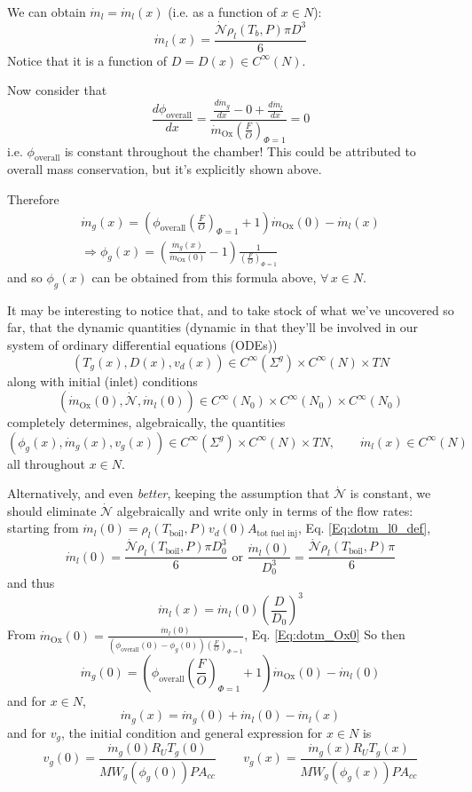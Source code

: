 \documentclass[10pt]{amsart}
\begin{document}
\begin{multicols*}{2}
We can obtain $\dot{m}_l = \dot{m}_l(x)$ (i.e. as a function of $x\in N$):
\[
\dot{m}_l(x) = \frac{ \dot{\mathcal{N}} \rho_l(T_b,P) \pi D^3}{6}
\]
Notice that it is a function of $D=D(x) \in C^{\infty}(N)$.  

Now consider that 
\[
\frac{d\phi_{\text{overall}}}{dx} = \frac{ \frac{ d\dot{m}_g}{dx} - 0 + \frac{d\dot{m}_l}{dx} }{ \dot{m}_{\text{Ox}} \left( \frac{F}{O} \right)_{\Phi =1} } = 0 
\]
i.e. $\phi_{\text{overall}}$ is constant throughout the chamber!  This could be attributed to overall mass conservation, but it's explicitly shown above.

Therefore
\begin{equation}
\begin{gathered}
  \dot{m}_g(x) = \left( \phi_{\text{overall}} \left( \frac{F}{O} \right)_{\Phi=1} + 1 \right) \dot{m}_{\text{Ox}}(0) - \dot{m}_l(x) \\
  \Longrightarrow \phi_g(x) = \left( \frac{\dot{m}_g(x)}{ \dot{m}_{\text{Ox}}(0) } - 1 \right) \frac{ 1}{ \left( \frac{F}{O} \right)_{\Phi=1} }
\end{gathered}
\end{equation}
and so $\phi_g(x)$ can be obtained from this formula above, $\forall \, x \in N$.  

It may be interesting to notice that, and to take stock of what we've uncovered so far, that the dynamic quantities (dynamic in that they'll be involved in our system of ordinary differential equations (ODEs))
\[
(T_g(x), D(x),v_d(x) ) \in C^{\infty}(\Sigma^g) \times C^{\infty}(N) \times TN
\]
along with initial (inlet) conditions
\[
( \dot{m}_{\text{Ox}}(0), \dot{\mathcal{N}}, \dot{m}_l(0) ) \in C^{\infty}(N_0) \times C^{\infty}(N_0) \times C^{\infty}(N_0)
\]
completely determines, algebraically, the quantities 
\[
(\phi_g(x), \dot{m}_g(x), v_g(x) ) \in C^{\infty}(\Sigma^g) \times C^{\infty}(N) \times TN, \qquad \dot{m}_l(x) \in C^{\infty}(N)
\]
all throughout $x\in N$.

Alternatively, and even \emph{better}, keeping the assumption that $\dot{\mathcal{N}}$ is constant, we should eliminate $\dot{\mathcal{N}}$ algebraically and write only in terms of the flow rates: starting from $\dot{m}_l(0) = \rho_l(T_{\text{boil}},P)v_d(0) A_{\text{tot fuel inj}}$, Eq. \ref{Eq:dotm_l0_def}, 
\[
\dot{m}_l(0) = \frac{ \dot{\mathcal{N}} \rho_l(T_{\text{boil}}, P) \pi D_0^3}{6} \text{ or } \frac{ \dot{m}_l(0) }{ D_0^3} = \frac{ \dot{\mathcal{N}} \rho_l(T_{\text{boil}}, P ) \pi }{ 6}
\]
and thus
\[
\dot{m}_l(x) =  \dot{m}_l(0) \left( \frac{D}{D_0} \right)^3
\]
From $\dot{m}_{\text{Ox}}(0) = \frac{ \dot{m}_l(0)}{ (\phi_{\text{overall}}(0) - \phi_g(0) ) \left( \frac{F}{O} \right)_{\Phi =1} }$, Eq. \ref{Eq:dotm_Ox0}
So then
\[
\dot{m}_g(0) = (\phi_{\text{overall}}\left( \frac{F}{O} \right)_{\Phi =1} + 1 ) \dot{m}_{\text{Ox}}(0) - \dot{m}_l(0)
\]
and for $x\in N$,
\[
\dot{m}_g(x) = \dot{m}_g(0) + \dot{m}_l(0) - \dot{m}_l(x)
\]
and for $v_g$, the initial condition and general expression for $x\in N$ is 
\[
v_g(0) = \frac{\dot{m}_g(0) R_U T_g(0) }{ MW_g(\phi_g(0)) P A_{cc} } \qquad \, v_g(x) = \frac{\dot{m}_g(x) R_U T_g(x) }{ MW_g(\phi_g(x)) P A_{cc} }
\]


\end{multicols*}
\end{document}
